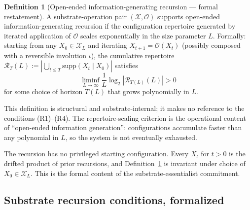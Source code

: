 \documentclass[11pt]{article}
\theoremstyle{plain}
\theoremstyle{definition}
\newtheorem{definition}[theorem]{Definition}
\newcommand{\Xset}{\mathcal{X}}
\newcommand{\Op}{\mathcal{O}}
\begin{document}
\begin{definition}[Open-ended information-generating recursion --- formal restatement]
\label{def:openended_formal}
A substrate-operation pair $(\Xset, \Op)$ supports \textnormal{open-ended information-generating recursion} if the configuration repertoire generated by iterated application of $\Op$ scales exponentially in the size parameter $L$. Formally: starting from any $X_0 \in \Xset_L$ and iterating $X_{t+1} = \Op(X_t)$ (possibly composed with a reversible involution $\iota$), the cumulative repertoire $\mathcal{R}_T(L) := |\bigcup_{t \le T} \mathrm{supp}(X_t \mid X_0)|$ satisfies
\[
\liminf_{L \to \infty} \frac{1}{L} \log_2 |\mathcal{R}_{T(L)}(L)| > 0
\]
for some choice of horizon $T(L)$ that grows polynomially in $L$.
\end{definition}

This definition is structural and substrate-internal; it makes no reference to the conditions (R1)--(R4). The repertoire-scaling criterion is the operational content of ``open-ended information generation'': configurations accumulate faster than any polynomial in $L$, so the system is not eventually exhausted.

The recursion has no privileged starting configuration. Every $X_t$ for $t > 0$ is the drifted product of prior recursions, and Definition~\ref{def:openended_formal} is invariant under choice of $X_0 \in \Xset_L$. This is the formal content of the substrate-essentialist commitment.

\subsection{Substrate recursion conditions, formalized}
\end{document}

